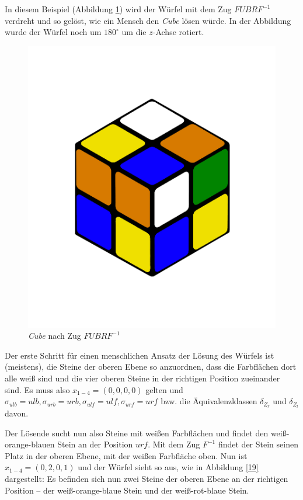 \documentclass[12pt,a4paper, usenames, dvipsnames]{article}
\begin{document}
In diesem Beispiel (Abbildung \ref{18}) wird der Würfel mit dem Zug $FUBRF^{-1}$ verdreht und so gelöst, wie ein Mensch den \textit{Cube} lösen würde.
In der Abbildung wurde der Würfel noch um $180^\circ$ um die $z$-Achse rotiert.

\begin{figure}[h]
\centering
\includegraphics[scale=0.12]{LURFL1.png}
\caption{\textit{Cube} nach Zug $FUBRF^{-1}$ }
\label{18}
\end{figure}

Der erste Schritt für einen menschlichen Ansatz der Lösung des Würfels ist (meistens), die Steine der oberen Ebene so anzuordnen, dass die Farbflächen dort alle weiß sind und die vier oberen Steine in der richtigen Position zueinander sind. 
Es muss also $x_{1-4} = (0,0,0,0)$ gelten und $\sigma_{ulb}=ulb, \sigma_{urb} = urb, \sigma_{ulf} = ulf, \sigma_{urf}=urf$ bzw. die Äquivalenzklassen $\delta_{Z_r}$ und $\delta_{Z_l}$ davon. 

Der Lösende sucht nun also Steine mit weißen Farbflächen und findet den weiß-orange-blauen Stein an der Position $urf$. 
Mit dem Zug $F^{-1}$ findet der Stein seinen Platz in der oberen Ebene, mit der weißen Farbfläche oben. 
Nun ist $x_{1-4}=(0,2,0,1)$ und der Würfel sieht so aus, wie in Abbildung \ref{19} dargestellt: Es befinden sich nun zwei Steine der oberen Ebene an der richtigen Position -- der weiß-orange-blaue Stein und der weiß-rot-blaue Stein.
\end{document}
